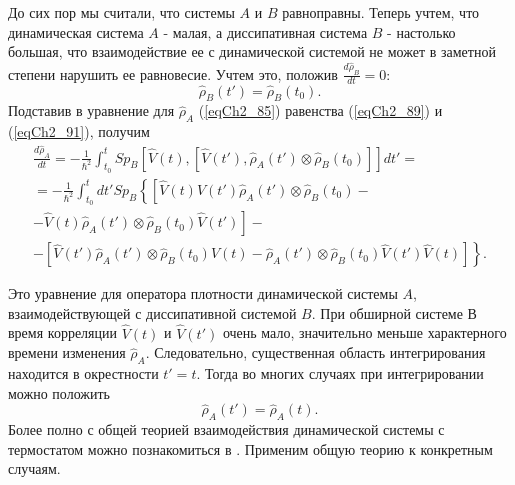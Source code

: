 До сих пор мы считали, что системы  $A$  и  $B$  равноправны. Теперь
учтем, что динамическая система  $A$ - малая, а диссипативная система
$B$ - настолько большая, что взаимодействие ее с динамической системой
не может в заметной степени нарушить ее равновесие. Учтем это, положив
$\frac{d \hat{\rho}_B}{d t} = 0$: 
\begin{equation}
\hat{\rho}_B\left(t'\right) =
\hat{\rho}_B\left(t_0\right).
\label{eqCh2_92}
\end{equation}
Подставив в уравнение для $\hat{\rho}_A$ (\ref{eqCh2_85}) равенства
(\ref{eqCh2_89}) и (\ref{eqCh2_91}), получим 
\begin{eqnarray}
\frac{d \hat{\rho}_A}{d t} = - \frac{1}{\hbar^2}
\int_{t_0}^t Sp_B\left[
\hat{V}\left(t\right),
\left[
\hat{V}\left(t'\right),
\hat{\rho}_A\left(t'\right) \otimes
\hat{\rho}_B\left(t_0\right)
\right]
\right]dt' = 
\nonumber \\ 
=
- \frac{1}{\hbar^2}
\int_{t_0}^t d t' Sp_B\left\{
\left[
\hat{V}\left(t\right)
\hat{V}\left(t'\right)
\hat{\rho}_A\left(t'\right) \otimes
\hat{\rho}_B\left(t_0\right) -
\right.
\right.
\nonumber \\
-
\left.
\left.
\hat{V}\left(t\right)
\hat{\rho}_A\left(t'\right) \otimes
\hat{\rho}_B\left(t_0\right)
\hat{V}\left(t'\right)
\right] - 
\right.
\nonumber \\
-
\left.
\left[
\hat{V}\left(t'\right)
\hat{\rho}_A\left(t'\right) \otimes
\hat{\rho}_B\left(t_0\right)
\hat{V}\left(t\right)
-
\hat{\rho}_A\left(t'\right) \otimes
\hat{\rho}_B\left(t_0\right)
\hat{V}\left(t'\right)\hat{V}\left(t\right) 
\right]
\right\}.
\label{eqCh2_93}
\end{eqnarray}

Это уравнение для оператора плотности динамической системы  $A$,
взаимодействующей с диссипативной системой $B$.  При обширной системе 
В  время корреляции $\hat{V}\left(t\right)$ и $\hat{V}\left(t'\right)$
очень мало, значительно меньше 
характерного времени изменения $\hat{\rho}_A$.  Следовательно,
существенная область интегрирования находится в окрестности $t' =
t$. Тогда во многих случаях при интегрировании можно положить
\[
\hat{\rho}_A\left(t'\right) =
\hat{\rho}_A\left(t\right).
\]
Более полно с общей теорией взаимодействия динамической системы с
термостатом можно познакомиться в \cite{bLaks1974}. Применим
общую теорию к конкретным случаям.  
 
